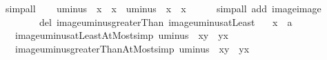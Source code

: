 \begin{isabellebody}
\ simp{\isacharunderscore}{\kern0pt}all\isanewline
\ \ \isamarkupfalse%
\ {\isachardoublequoteopen}uminus\ {\isacharbackquote}{\kern0pt}\ {\isacharbraceleft}{\kern0pt}{\isachardot}{\kern0pt}{\isachardot}{\kern0pt}{\isacharless}{\kern0pt}x{\isacharbraceright}{\kern0pt}\ {\isacharequal}{\kern0pt}\ {\isacharbraceleft}{\kern0pt}{\isacharminus}{\kern0pt}x{\isacharless}{\kern0pt}{\isachardot}{\kern0pt}{\isachardot}{\kern0pt}{\isacharbraceright}{\kern0pt}{\isachardoublequoteclose}\ \ {\isachardoublequoteopen}uminus\ {\isacharbackquote}{\kern0pt}\ {\isacharbraceleft}{\kern0pt}{\isachardot}{\kern0pt}{\isachardot}{\kern0pt}x{\isacharbraceright}{\kern0pt}\ {\isacharequal}{\kern0pt}\ {\isacharbraceleft}{\kern0pt}{\isacharminus}{\kern0pt}x{\isachardot}{\kern0pt}{\isachardot}{\kern0pt}{\isacharbraceright}{\kern0pt}{\isachardoublequoteclose}\isanewline
\ \ \ \ \isamarkupfalse%
\ {\isacharparenleft}{\kern0pt}simp{\isacharunderscore}{\kern0pt}all\ add{\isacharcolon}{\kern0pt}\ image{\isacharunderscore}{\kern0pt}image\isanewline
\ \ \ \ \ \ \ \ del{\isacharcolon}{\kern0pt}\ image{\isacharunderscore}{\kern0pt}uminus{\isacharunderscore}{\kern0pt}greaterThan\ image{\isacharunderscore}{\kern0pt}uminus{\isacharunderscore}{\kern0pt}atLeast{\isacharparenright}{\kern0pt}\isanewline
{}\isamarkupfalse%
%
\endisatagproof
{\isafoldproof}%
%
\isadelimproof
\isanewline
%
\endisadelimproof
\isanewline
{}\isamarkupfalse%
\isanewline
\ \ \ x\ {\isacharcolon}{\kern0pt}{\isacharcolon}{\kern0pt}\ {\isacharprime}{\kern0pt}a\isanewline
\ \ \ image{\isacharunderscore}{\kern0pt}uminus{\isacharunderscore}{\kern0pt}atLeastAtMost{\isacharbrackleft}{\kern0pt}simp{\isacharbrackright}{\kern0pt}{\isacharcolon}{\kern0pt}\ {\isachardoublequoteopen}uminus\ {\isacharbackquote}{\kern0pt}\ {\isacharbraceleft}{\kern0pt}x{\isachardot}{\kern0pt}{\isachardot}{\kern0pt}y{\isacharbraceright}{\kern0pt}\ {\isacharequal}{\kern0pt}\ {\isacharbraceleft}{\kern0pt}{\isacharminus}{\kern0pt}y{\isachardot}{\kern0pt}{\isachardot}{\kern0pt}{\isacharminus}{\kern0pt}x{\isacharbraceright}{\kern0pt}{\isachardoublequoteclose}\isanewline
\ \ \ image{\isacharunderscore}{\kern0pt}uminus{\isacharunderscore}{\kern0pt}greaterThanAtMost{\isacharbrackleft}{\kern0pt}simp{\isacharbrackright}{\kern0pt}{\isacharcolon}{\kern0pt}\ {\isachardoublequoteopen}uminus\ {\isacharbackquote}{\kern0pt}\ {\isacharbraceleft}{\kern0pt}x{\isacharless}{\kern0pt}{\isachardot}{\kern0pt}{\isachardot}{\kern0pt}y{\isacharbraceright}{\kern0pt}\ {\isacharequal}{\kern0pt}\ {\isacharbraceleft}{\kern0pt}{\isacharminus}{\kern0pt}y{\isachardot}{\kern0pt}{\isachardot}{\kern0pt}{\isacharless}{\kern0pt}{\isacharminus}{\kern0pt}x{\isacharbraceright}{\kern0pt}{\isachardoublequoteclose}\isanewline

\end{isabellebody}
